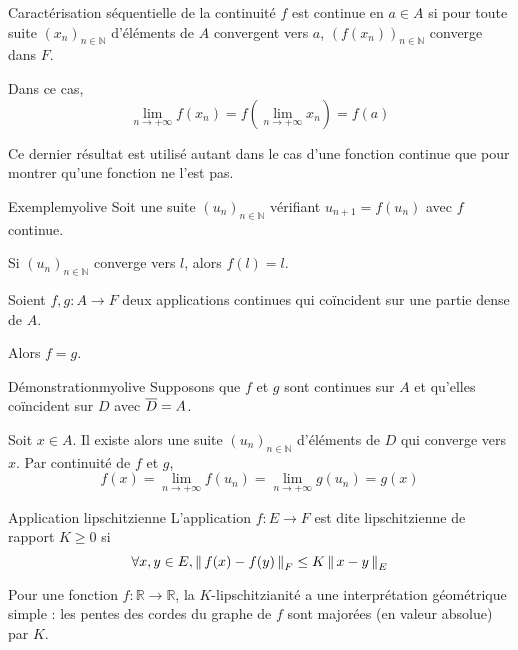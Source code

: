     \begin{prop}{Caractérisation séquentielle de la continuité}{}
        $f$ est continue en $a \in A$ si pour toute suite $(x_n)_{n \in \mathbb{N}}$ d’éléments de $A$ convergent vers $a$, $\left(f(x_n)\right)_{n \in \mathbb{N}}$ converge dans $F$.

        Dans ce cas, 
        \[ \lim\limits_{n \rightarrow +\infty} f(x_n) = f \left(\lim\limits_{n \rightarrow +\infty} x_n\right) = f(a) \] 
    \end{prop}

    Ce dernier résultat est utilisé autant dans le cas d’une fonction continue que pour montrer qu’une fonction ne l’est pas.

    \begin{omed}{Exemple}{myolive}
        Soit une suite $(u_n)_{n \in \mathbb{N}}$ vérifiant $u_{n+1} = f(u_n)$ avec $f$ continue.

        Si $(u_n)_{n \in \mathbb{N}}$ converge vers $l$, alors $f(l)=l$.
    \end{omed}

    \begin{prop}{}{}
        Soient $f,g : A \rightarrow F$ deux applications continues qui coïncident sur une partie dense de $A$. 

        Alors $f = g$.
    \end{prop}

    \begin{demo}{Démonstration}{myolive}
        Supposons que $f$ et $g$ sont continues sur $A$ et qu’elles coïncident sur $D$ avec $\overline{D} = A$.

        Soit $x \in A$. Il existe alors une suite $(u_n)_{n \in \mathbb{N}}$ d’éléments de $D$ qui converge vers $x$. Par continuité de $f$ et $g$,
        \[ f(x) = \lim\limits_{n \rightarrow +\infty} f(u_n) = \lim\limits_{n \rightarrow +\infty} g(u_n) = g(x) \] 
    \end{demo}

    \begin{defi}{Application lipschitzienne}{}
        L’application $f : E \rightarrow F$ est dite lipschitzienne de rapport $K \geq 0$ si 
        \[ \forall x,y \in E, \left\lVert \,f(x) - f(y) \, \right\rVert_F \leq K \left\lVert \,x-y \, \right\rVert_E \] 
    \end{defi}

    Pour une fonction $f: \mathbb{R} \rightarrow \mathbb{R}$, la $K$-lipschitzianité a une interprétation géométrique simple : les pentes des cordes du graphe de $f$ sont majorées (en valeur absolue) par $K$.

